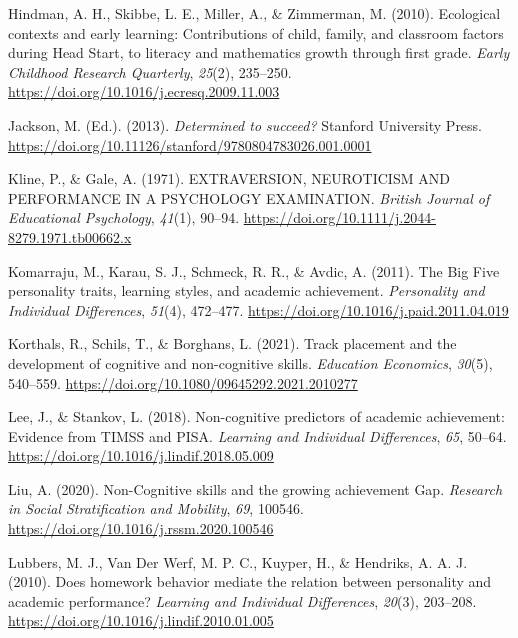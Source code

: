 \documentclass[
  12pt,
  a4paper,
]{article}
\newlength{\cslhangindent}
\newlength{\cslentryspacingunit} %
\newenvironment{CSLReferences}[2] %
 {%
  \setlength{\parindent}{0pt}
  \ifodd #1
  \let\oldpar\par
  \def\par{\hangindent=\cslhangindent\oldpar}
  \fi
  \setlength{\parskip}{#2\cslentryspacingunit}
 }%
 {}
\begin{document}
\begin{CSLReferences}{1}{0}
\leavevmode{}%
Hindman, A. H., Skibbe, L. E., Miller, A., \& Zimmerman, M. (2010).
Ecological contexts and early learning: Contributions of child, family,
and classroom factors during Head Start, to literacy and mathematics
growth through first grade. \emph{Early Childhood Research Quarterly},
\emph{25}(2), 235--250.
\url{https://doi.org/10.1016/j.ecresq.2009.11.003}

\leavevmode{}%
Jackson, M. (Ed.). (2013). \emph{Determined to succeed?} Stanford
University Press.
\url{https://doi.org/10.11126/stanford/9780804783026.001.0001}

\leavevmode{}%
Kline, P., \& Gale, A. (1971). EXTRAVERSION, NEUROTICISM AND PERFORMANCE
IN A PSYCHOLOGY EXAMINATION. \emph{British Journal of Educational
Psychology}, \emph{41}(1), 90--94.
\url{https://doi.org/10.1111/j.2044-8279.1971.tb00662.x}

\leavevmode{}%
Komarraju, M., Karau, S. J., Schmeck, R. R., \& Avdic, A. (2011). The
Big Five personality traits, learning styles, and academic achievement.
\emph{Personality and Individual Differences}, \emph{51}(4), 472--477.
\url{https://doi.org/10.1016/j.paid.2011.04.019}

\leavevmode{}%
Korthals, R., Schils, T., \& Borghans, L. (2021). Track placement and
the development of cognitive and non-cognitive skills. \emph{Education
Economics}, \emph{30}(5), 540--559.
\url{https://doi.org/10.1080/09645292.2021.2010277}

\leavevmode{}%
Lee, J., \& Stankov, L. (2018). Non-cognitive predictors of academic
achievement: Evidence from TIMSS and PISA. \emph{Learning and Individual
Differences}, \emph{65}, 50--64.
\url{https://doi.org/10.1016/j.lindif.2018.05.009}

\leavevmode{}%
Liu, A. (2020). Non-Cognitive skills and the growing achievement Gap.
\emph{Research in Social Stratification and Mobility}, \emph{69},
100546. \url{https://doi.org/10.1016/j.rssm.2020.100546}

\leavevmode{}%
Lubbers, M. J., Van Der Werf, M. P. C., Kuyper, H., \& Hendriks, A. A.
J. (2010). Does homework behavior mediate the relation between
personality and academic performance? \emph{Learning and Individual
Differences}, \emph{20}(3), 203--208.
\url{https://doi.org/10.1016/j.lindif.2010.01.005}


\end{CSLReferences}
\end{document}
